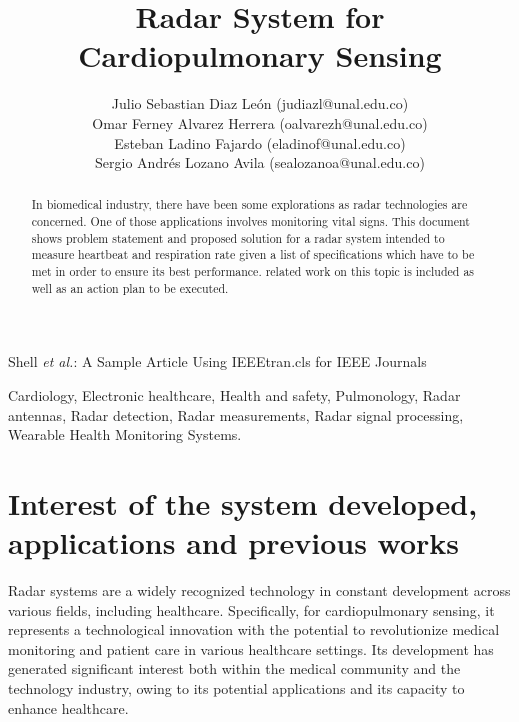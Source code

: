 \documentclass[lettersize,journal]{IEEEtran}
\begin{document}
\title{Radar System for Cardiopulmonary Sensing}

\author{Julio Sebastian Diaz León (judiazl@unal.edu.co)\\Omar Ferney Alvarez Herrera (oalvarezh@unal.edu.co) \\ Esteban Ladino Fajardo (eladinof@unal.edu.co) \\Sergio Andrés Lozano Avila (sealozanoa@unal.edu.co)}

%
{Shell \MakeLowercase{\textit{et al.}}: A Sample Article Using IEEEtran.cls for IEEE Journals}


\maketitle

\begin{abstract}
In biomedical industry, there have been some explorations as radar technologies are concerned. One of those applications involves monitoring vital signs. This document shows problem statement and proposed solution for a radar system intended to measure heartbeat and respiration rate given a list of specifications which have to be met in order to ensure its best performance. related work on this topic is included as well as an action plan to be executed. 
\end{abstract}

\begin{IEEEkeywords}
Cardiology, Electronic healthcare, Health and safety, Pulmonology, Radar antennas, Radar detection, Radar measurements, Radar signal processing, Wearable Health Monitoring Systems.
\end{IEEEkeywords}


\section{Interest of the system developed, applications and previous works}


Radar systems are a widely recognized technology in constant development across various fields, including healthcare. Specifically, for cardiopulmonary sensing, it represents a technological innovation with the potential to revolutionize medical monitoring and patient care in various healthcare settings. Its development has generated significant interest both within the medical community and the technology industry, owing to its potential applications and its capacity to enhance healthcare.\\
\end{document}
